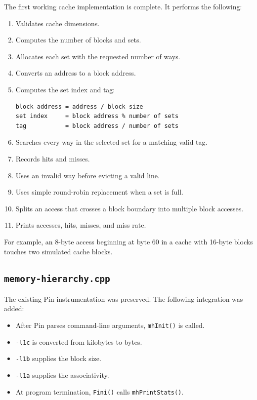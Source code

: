 \documentclass[11pt]{article}
\begin{document}
The first working cache implementation is complete. It performs the following:
\begin{enumerate}[leftmargin=*]
  \item Validates cache dimensions.
  \item Computes the number of blocks and sets.
  \item Allocates each set with the requested number of ways.
  \item Converts an address to a block address.
  \item Computes the set index and tag:
\begin{verbatim}
block address = address / block size
set index     = block address % number of sets
tag           = block address / number of sets
\end{verbatim}
  \item Searches every way in the selected set for a matching valid tag.
  \item Records hits and misses.
  \item Uses an invalid way before evicting a valid line.
  \item Uses simple round-robin replacement when a set is full.
  \item Splits an access that crosses a block boundary into multiple block
        accesses.
  \item Prints accesses, hits, misses, and miss rate.
\end{enumerate}

For example, an 8-byte access beginning at byte 60 in a cache with 16-byte
blocks touches two simulated cache blocks.

\subsection{\texttt{memory-hierarchy.cpp}}

The existing Pin instrumentation was preserved. The following integration was
added:
\begin{itemize}[leftmargin=*]
  \item After Pin parses command-line arguments, \texttt{mhInit()} is called.
  \item \texttt{-l1c} is converted from kilobytes to bytes.
  \item \texttt{-l1b} supplies the block size.
  \item \texttt{-l1a} supplies the associativity.
  \item At program termination, \texttt{Fini()} calls \texttt{mhPrintStats()}.
\end{itemize}
\end{document}
